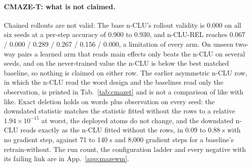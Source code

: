 \documentclass{article} %
\newcommand{\sci}[2]{\ensuremath{#1\times10^{#2}}}
\begin{document}
\paragraph{CMAZE-T: what is not claimed.} Chained rollouts are not valid: The base n-CLU's rollout validity
is 0.000 on all six seeds at a per-step accuracy of 0.900 to 0.930, and n-CLU-REL reaches 0.067 /
0.000 / 0.289 / 0.267 / 0.156 / 0.000, a limitation of every arm. On unseen two-way pairs a learned
arm that reads main effects only beats the n-CLU on several seeds, and on the never-trained value the
n-CLU is below the best matched baseline, so nothing is claimed on either row. The earlier asymmetric
n-CLU row, in which the n-CLU read the word design and the baselines read only the observation, is
printed in Tab.~\ref{tab:cmazet} and is not a comparison of like with like. Exact deletion holds on
words plus observation on every seed: the downdated statistic matches the statistic fitted without
the rows to a relative \sci{1.94}{-15} at worst, the deployed atoms do not change, and the downdated
n-CLU reads exactly as the n-CLU fitted without the rows, in 0.09 to 0.88 s with no gradient step,
against 71 to 140 s and 8,000 gradient steps for a baseline's retrain-without.
The run count, the configuration ladder and every negative with its failing link are in
App.~\ref{app:mazewm}.

\end{document}
